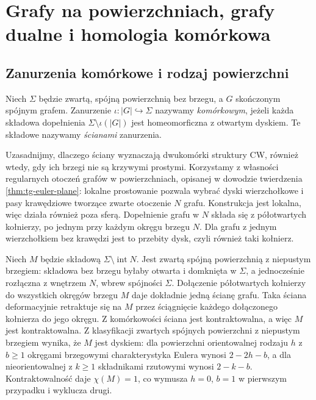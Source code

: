 \chapter{Grafy na powierzchniach, grafy dualne i homologia komórkowa}
\label{ch:tg-powierzchnie}

\section{Zanurzenia komórkowe i rodzaj powierzchni}
\label{sec:tg-cellular-surface}

\begin{definicja}
Niech $\Sigma$ będzie zwartą, spójną powierzchnią bez brzegu,
a $G$ skończonym spójnym grafem. Zanurzenie
$\iota:|G|\hookrightarrow\Sigma$ nazywamy \emph{komórkowym},
jeżeli każda składowa dopełnienia $\Sigma\setminus\iota(|G|)$
jest homeomorficzna z otwartym dyskiem. Te składowe nazywamy
\emph{ścianami} zanurzenia.
\end{definicja}

Uzasadnijmy, dlaczego ściany wyznaczają dwukomórki struktury CW,
również wtedy, gdy ich brzegi nie są krzywymi prostymi.
Korzystamy z własności regularnych otoczeń grafów w powierzchniach,
opisanej w dowodzie twierdzenia \ref{thm:tg-euler-plane}:
lokalne prostowanie pozwala wybrać dyski wierzchołkowe i pasy
krawędziowe tworzące zwarte otoczenie $N$ grafu.
Konstrukcja jest lokalna, więc działa również poza sferą.
Dopełnienie grafu w $N$ składa się z półotwartych kołnierzy,
po jednym przy każdym okręgu brzegu $N$.
Dla grafu z jednym wierzchołkiem bez krawędzi jest to
przebity dysk, czyli również taki kołnierz.

Niech $M$ będzie składową $\Sigma\setminus\operatorname{int}N$.
Jest zwartą spójną powierzchnią z niepustym brzegiem:
składowa bez brzegu byłaby otwarta i domknięta w $\Sigma$,
a jednocześnie rozłączna z wnętrzem $N$, wbrew spójności
$\Sigma$. Dołączenie półotwartych kołnierzy do wszystkich
okręgów brzegu $M$ daje dokładnie jedną ścianę grafu.
Taka ściana deformacyjnie retraktuje się na $M$ przez
ściągnięcie każdego dołączonego kołnierza do jego okręgu.
Z komórkowości ściana jest kontraktowalna, a więc $M$
jest kontraktowalna. Z klasyfikacji zwartych spójnych
powierzchni z niepustym brzegiem wynika, że $M$ jest
dyskiem: dla powierzchni orientowalnej rodzaju $h$
z $b\ge1$ okręgami brzegowymi charakterystyka Eulera
wynosi $2-2h-b$, a dla nieorientowalnej z $k\ge1$
składnikami rzutowymi wynosi $2-k-b$.
Kontraktowalność daje $\chi(M)=1$, co wymusza
$h=0$, $b=1$ w pierwszym przypadku i wyklucza drugi.

